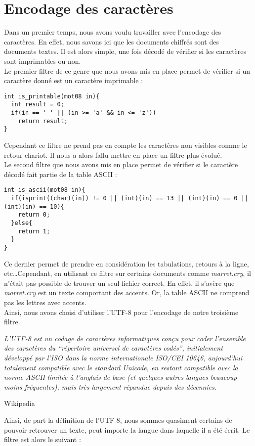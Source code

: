 \section{Encodage des caractères}
Dans un premier temps, nous avons voulu travailler avec l'encodage des caractères. En effet, nous savons ici que les documents chiffrés sont des documents textes. Il est alors simple, une fois décodé de vérifier si les caractères sont imprimables ou non.\\
Le premier filtre de ce genre que nous avons mis en place permet de vérifier si un caractère donné est un caractère imprimable :
\begin{lstlisting}[style=customc]
 int is_printable(mot08 in){
  int result = 0;
  if(in == ' ' || (in >= 'a' && in <= 'z'))
    return result;
}
\end{lstlisting}
Cependant ce filtre ne prend pas en compte les caractères non visibles comme le retour chariot. Il nous a alors fallu mettre en place un filtre plus évolué.\\
Le second filtre que nous avons mis en place permet de vérifier si le caractère décodé fait partie de la table ASCII :
\begin{lstlisting}[style=customc]
 int is_ascii(mot08 in){
  if(isprint((char)(in)) != 0 || (int)(in) == 13 || (int)(in) == 0 || (int)(in) == 10){
    return 0;
  }else{
    return 1;
  }
}
\end{lstlisting}
Ce dernier permet de prendre en considération les tabulations, retours à la ligne, etc\ldots Cependant, en utilisant ce filtre sur certains documents comme \textit{marret.cry}, il n'était pas possible de trouver un seul fichier correct. En effet, il s'avère que \textit{marret.cry} est un texte comportant des accents. Or, la table ASCII ne comprend pas les lettres avec accents.\\
Ainsi, nous avons choisi d'utiliser l'UTF-8 pour l'encodage de notre troisième filtre. 
\epigraph{\textit{L'UTF-8 est un codage de caractères informatiques conçu pour coder l’ensemble des caractères du \enquote{répertoire universel de caractères codés}, initialement développé par l’ISO dans la norme internationale ISO/CEI 10646, aujourd’hui totalement compatible avec le standard Unicode, en restant compatible avec la norme ASCII limitée à l’anglais de base (et quelques autres langues beaucoup moins fréquentes), mais très largement répandue depuis des décennies.}}{Wikipedia\cite{UTF8}}
Ainsi, de part la définition de l'UTF-8, nous sommes quasiment certains de pouvoir retrouver un texte, peut importe la langue dans laquelle il a été écrit. Le filtre est alors le suivant :
